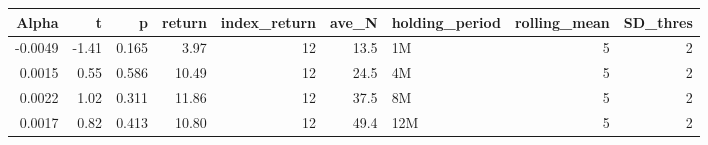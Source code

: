 \begin{table}[ht]
\centering
\begin{tabular}{rrrrrrlrr}
  \hline
Alpha & t & p & return & index\_return & ave\_N & holding\_period & rolling\_mean & SD\_thres \\ 
  \hline
-0.0049 & -1.41 & 0.165 & 3.97 & 12 & 13.5 & 1M &  5 &  2 \\ 
  0.0015 & 0.55 & 0.586 & 10.49 & 12 & 24.5 & 4M &  5 &  2 \\ 
  0.0022 & 1.02 & 0.311 & 11.86 & 12 & 37.5 & 8M &  5 &  2 \\ 
  0.0017 & 0.82 & 0.413 & 10.80 & 12 & 49.4 & 12M &  5 &  2 \\ 
   \hline
\end{tabular}
\end{table}


